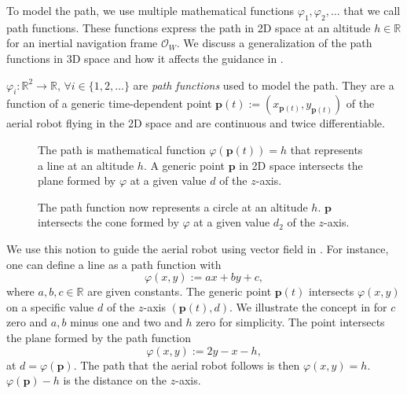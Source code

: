 To model the path, we use multiple mathematical functions $\varphi_1,\varphi_2,\dots$ that we call path functions. These functions express the path in 2D space at an altitude $h\in\mathbb{R}$ for an inertial navigation frame $\mathcal{O}_W$. We discuss a generalization of the path functions in 3D space and how it affects the guidance in . 

\begin{defn}
  \label{def:paths}
  $\varphi_i:\mathbb{R}^2\rightarrow\mathbb{R},\,\forall i\in\{1,2,\dots\}$ are \emph{path functions} used to model the path. They are a function of a generic time-dependent point $\mathbf{p}(t):=(x_{\mathbf{p}(t)},y_{\mathbf{p}(t)})$ of the aerial robot flying in the 2D space and are continuous and twice differentiable. 
\end{defn}

\begin{figure}[t!]
  \centering
  
  \caption[Concept of a line as a path function]{The path is mathematical function $\varphi(\mathbf{p}(t))=h$ that represents a line at an altitude $h$. A generic point $\mathbf{p}$ in 2D space intersects the plane formed by $\varphi$ at a given value $d$ of the $z$-axis.}
  \label{fig:line-pf}
\end{figure}

\begin{figure}[t!]
  \centering
  
  \caption[Concept of a circle as a path function]{The path function now represents a circle at an altitude $h$. $\mathbf{p}$ intersects the cone formed by $\varphi$ at a given value $d_2$ of the $z$-axis.}
  \label{fig:circle-pf}
\end{figure}

We use this notion to guide the aerial robot using vector field in . For instance, one can define a line as a path function with
\begin{equation}\label{eq:basic-path}
  \varphi(x,y):=ax+by+c,
\end{equation}
where $a,b,c\in\mathbb{R}$ are given constants. The generic point $\mathbf{p}(t)$ intersects $\varphi(x,y)$ on a specific value $d$ of the $z$-axis $(\mathbf{p}(t),d)$. We illustrate the concept in  for $c$ zero and $a,b$ minus one and two and $h$ zero for simplicity. The point intersects the plane formed by the path function
\begin{equation}\label{eq:pathf-line}
  \varphi(x,y):=2y-x-h,
\end{equation}
at $d=\varphi(\mathbf{p})$. The path that the aerial robot follows is then $\varphi(x,y)=h$. $\varphi(\mathbf{p})-h$ is the distance on the $z$-axis.

